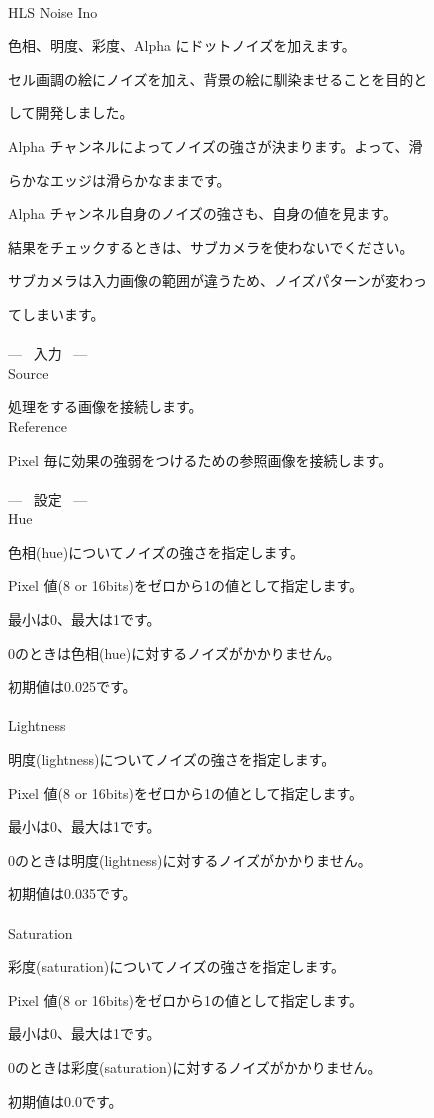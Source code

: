 \documentclass[a4paper,12pt]{article}
\begin{document}
\thispagestyle{empty}

\Large
\noindent \\
HLS Noise Ino\medskip
\par
\normalsize
色相、明度、彩度、Alpha にドットノイズを加えます。\par
セル画調の絵にノイズを加え、背景の絵に馴染ませることを目的と\par
して開発しました。\\
\par
Alpha チャンネルによってノイズの強さが決まります。よって、滑\par
らかなエッジは滑らかなままです。\par
Alpha チャンネル自身のノイズの強さも、自身の値を見ます。\\
\par
結果をチェックするときは、サブカメラを使わないでください。\par
サブカメラは入力画像の範囲が違うため、ノイズパターンが変わっ\par
てしまいます。\\
\\
--- \ 入力 \ ---\\
Source\par
処理をする画像を接続します。\\
Reference\par
Pixel 毎に効果の強弱をつけるための参照画像を接続します。\\
\\
--- \ 設定 \ ---\\
Hue\par
色相(hue)についてノイズの強さを指定します。\par
Pixel 値(8 or 16bits)をゼロから1の値として指定します。\par
最小は0、最大は1です。\par
0のときは色相(hue)に対するノイズがかかりません。\par
初期値は0.025です。\\
\\
Lightness\par
明度(lightness)についてノイズの強さを指定します。\par
Pixel 値(8 or 16bits)をゼロから1の値として指定します。\par
最小は0、最大は1です。\par
0のときは明度(lightness)に対するノイズがかかりません。\par
初期値は0.035です。\\
\\
Saturation\par
彩度(saturation)についてノイズの強さを指定します。\par
Pixel 値(8 or 16bits)をゼロから1の値として指定します。\par
最小は0、最大は1です。\par
0のときは彩度(saturation)に対するノイズがかかりません。\par
初期値は0.0です。
\end{document}
